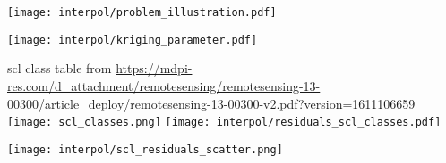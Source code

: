


\begin{frame}
    \texttt{[image: interpol/problem\_illustration.pdf]}
\end{frame}

    
        


\begin{frame}[fragile]

    \vspace{-1cm}
    \tiny
    
    \normalsize
\end{frame}


\begin{frame}
    \texttt{[image: interpol/kriging\_parameter.pdf]}
\end{frame}

\begin{frame}
    scl class table from \url{https://mdpi-res.com/d_attachment/remotesensing/remotesensing-13-00300/article_deploy/remotesensing-13-00300-v2.pdf?version=1611106659}
    \texttt{[image: scl\_classes.png]}
    \texttt{[image: interpol/residuals\_scl\_classes.pdf]}
\end{frame}

\begin{frame}
    \begin{center}
        \texttt{[image: interpol/scl\_residuals\_scatter.png]}
    \end{center}
\end{frame}